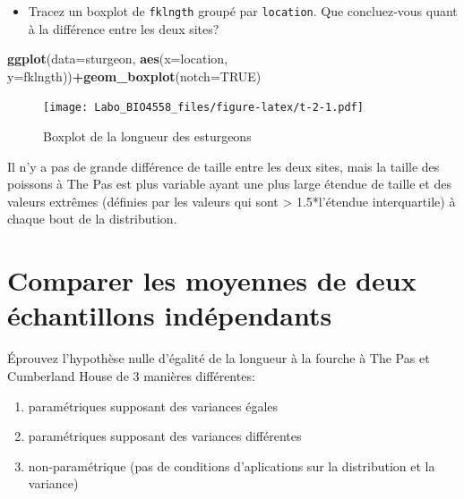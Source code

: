 \documentclass[12pt,]{book}
\newenvironment{Shaded}{\begin{snugshade}}{\end{snugshade}}
\newcommand{\DataTypeTok}[1]{\textcolor[rgb]{0.27,0.27,0.27}{#1}}
\newcommand{\KeywordTok}[1]{\textcolor[rgb]{0.27,0.27,0.27}{\textbf{#1}}}
\newcommand{\NormalTok}[1]{#1}
\newcommand{\OperatorTok}[1]{\textcolor[rgb]{0.43,0.43,0.43}{\textbf{#1}}}
\newcommand{\OtherTok}[1]{\textcolor[rgb]{0.37,0.37,0.37}{#1}}
\providecommand{\tightlist}{%
  \setlength{\itemsep}{0pt}\setlength{\parskip}{0pt}}
\begin{document}
\begin{itemize}
\tightlist
\item
  Tracez un boxplot de \texttt{fklngth} groupé par \texttt{location}. Que concluez-vous quant à la différence entre les deux sites?
\end{itemize}

\begin{Shaded}
\begin{Highlighting}[]
\KeywordTok{ggplot}\NormalTok{(}\DataTypeTok{data=}\NormalTok{sturgeon, }\KeywordTok{aes}\NormalTok{(}\DataTypeTok{x=}\NormalTok{location,}
\DataTypeTok{y=}\NormalTok{fklngth))}\OperatorTok{+}\KeywordTok{geom_boxplot}\NormalTok{(}\DataTypeTok{notch=}\OtherTok{TRUE}\NormalTok{)}
\end{Highlighting}
\end{Shaded}

\begin{figure}
\centering
\texttt{[image: Labo\_BIO4558\_files/figure-latex/t-2-1.pdf]}
\caption{\label{fig:t-2}Boxplot de la longueur des esturgeons}
\end{figure}

Il n'y a pas de grande différence de taille entre les deux sites, mais la taille des poissons à The Pas est plus variable ayant une plus large étendue de taille et des valeurs extrêmes (définies par les valeurs qui sont \textgreater{} 1.5*l'étendue interquartile) à chaque bout de la distribution.

\hypertarget{comparer-les-moyennes-de-deux-uxe9chantillons-induxe9pendants}{%
\section{Comparer les moyennes de deux échantillons indépendants}\label{comparer-les-moyennes-de-deux-uxe9chantillons-induxe9pendants}}

Éprouvez l'hypothèse nulle d'égalité de la longueur à la fourche à The Pas et Cumberland House de 3 manières différentes:

\begin{enumerate}
\def\labelenumi{\arabic{enumi}.}
\tightlist
\item
  paramétriques supposant des variances égales
\item
  paramétriques supposant des variances différentes
\item
  non-paramétrique (pas de conditions d'aplications sur la distribution et la variance)
\end{enumerate}
\end{document}
